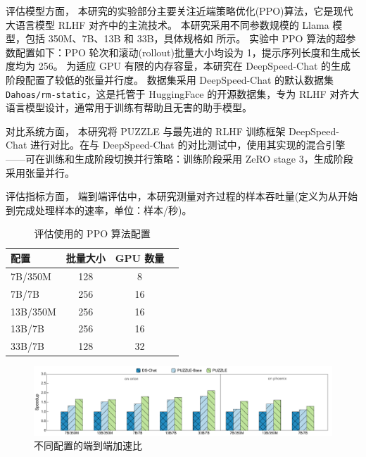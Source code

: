 评估模型方面，
本研究的实验部分主要关注近端策略优化(PPO)算法，它是现代大语言模型 RLHF 对齐中的主流技术。
本研究采用不同参数规模的 Llama 模型，包括 350M、7B、13B 和 33B，具体规格如 所示。  
实验中 PPO 算法的超参数配置如下：PPO 轮次和滚动(rollout)批量大小均设为 1，提示序列长度和生成长度均为 256。
为适应 GPU 有限的内存容量，本研究在 DeepSpeed-Chat 的生成阶段配置了较低的张量并行度。  
数据集采用 DeepSpeed-Chat 的默认数据集 \texttt{Dahoas/rm-static}，这是托管于 HuggingFace 的开源数据集，专为 RLHF 对齐大语言模型设计，通常用于训练有帮助且无害的助手模型。 






对比系统方面，
本研究将 PUZZLE 与最先进的 RLHF 训练框架 DeepSpeed-Chat\cite{yao2023deepspeedchat} 进行对比。在与 DeepSpeed-Chat 的对比测试中，使用其实现的混合引擎——可在训练和生成阶段切换并行策略：训练阶段采用 ZeRO stage 3\cite{rajbhandari2020zero}，生成阶段采用张量并行。  


评估指标方面，  
端到端评估中，本研究测量对齐过程的样本吞吐量(定义为从开始到完成处理样本的速率，单位：样本/秒)。  

\begin{table}[h]
\caption{评估使用的 PPO 算法配置}
\label{table:end2end-config}
\small
\centering
\begin{tabular}{lccc}
\toprule
配置          & 批量大小   & GPU 数量 \\ 
\midrule
7B/350M      & 128        &  8      \\
7B/7B        & 256        &  16     \\
13B/350M     & 256        &  16     \\
13B/7B       & 256        &  16     \\
33B/7B       & 128        &  32     \\
\bottomrule
\end{tabular}
\end{table}



\begin{figure}[t]
    \centering
    \includegraphics[width=\linewidth, keepaspectratio]{figures/puzzle/end2end.pdf}
    \vspace{-0.3cm}
    \caption{不同配置的端到端加速比}
    \label{fig:end2end}
\end{figure}

